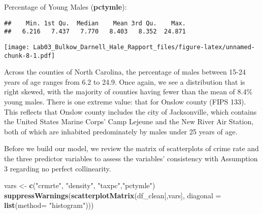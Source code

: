 \documentclass[]{article}
\newenvironment{Shaded}{\begin{snugshade}}{\end{snugshade}}
\newcommand{\KeywordTok}[1]{\textcolor[rgb]{0.13,0.29,0.53}{\textbf{#1}}}
\newcommand{\DataTypeTok}[1]{\textcolor[rgb]{0.13,0.29,0.53}{#1}}
\newcommand{\DecValTok}[1]{\textcolor[rgb]{0.00,0.00,0.81}{#1}}
\newcommand{\StringTok}[1]{\textcolor[rgb]{0.31,0.60,0.02}{#1}}
\newcommand{\OperatorTok}[1]{\textcolor[rgb]{0.81,0.36,0.00}{\textbf{#1}}}
\newcommand{\NormalTok}[1]{#1}
\begin{document}
Percentage of Young Males (\textbf{pctymle}):

\begin{Shaded}
\end{Shaded}

\begin{verbatim}
##    Min. 1st Qu.  Median    Mean 3rd Qu.    Max. 
##   6.216   7.437   7.770   8.403   8.352  24.871
\end{verbatim}

\begin{Shaded}
\end{Shaded}

\texttt{[image: Lab03\_Bulkow\_Darnell\_Hale\_Rapport\_files/figure-latex/unnamed-chunk-8-1.pdf]}

Across the counties of North Carolina, the percentage of males between
15-24 years of age ranges from 6.2 to 24.9. Once again, we see a
distribution that is right skewed, with the majority of counties having
fewer than the mean of 8.4\% young males. There is one extreme value:
that for Onslow county (FIPS 133). This reflects that Onslow county
includes the city of Jacksonville, which contains the United States
Marine Corps' Camp Lejeune and the New River Air Station, both of which
are inhabited predominately by males under 25 years of age.

Before we build our model, we review the matrix of scatterplots of crime
rate and the three predictor variables to assess the variables'
consistency with Assumption 3 regarding no perfect collinearity.

\begin{Shaded}
\begin{Highlighting}[]
\NormalTok{vars <-}\StringTok{ }\KeywordTok{c}\NormalTok{(}\StringTok{"crmrte"}\NormalTok{, }\StringTok{"density"}\NormalTok{, }\StringTok{"taxpc"}\NormalTok{,}\StringTok{"pctymle"}\NormalTok{)}
\KeywordTok{suppressWarnings}\NormalTok{(}\KeywordTok{scatterplotMatrix}\NormalTok{(df_clean[,vars], }\DataTypeTok{diagonal =} \KeywordTok{list}\NormalTok{(}\DataTypeTok{method=} \StringTok{"histogram"}\NormalTok{)))}
\end{Highlighting}
\end{Shaded}
\end{document}
